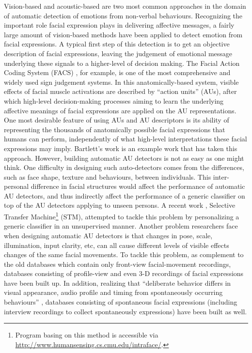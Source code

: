 Vision-based and acoustic-based are two most common approaches in the domain of automatic detection of emotions from non-verbal behaviours. Recognizing the important role facial expression plays in delivering affective messages, a fairly large amount of vision-based methods have been applied to detect emotion from facial expressions. A typical first step of this detection is to get an objective description of facial expressions, leaving the judgement of emotional message underlying these signals to a higher-level of decision making. The Facial Action Coding System (FACS) \cite{ekm02}, for example, is one of the most comprehensive and widely used sign judgement systems. In this anatomically-based system, visible effects of facial muscle activations are described by ``action units'' (AUs), after which high-level decision-making processes aiming to learn the underlying affective meanings of facial expressions are applied on the AU representations. One most desirable feature of using AUs and AU descriptors is its ability of representing the thousands of anatomically possible facial expressions that humans can perform, independently of what high-level interpretations these facial expressions may imply. Bartlett's work \cite{bartlett2005recognizing} is an example work that has taken this approach. However, building automatic AU detectors is not as easy as one might think. One difficulty in designing such auto-detectors comes from the differences, such as face shape, texture and behaviours, between individuals. This inter-personal difference in facial structures would affect the performance of automatic AU detectors, and thus indirectly affect the performance of a generic classifier on top of the AU detectors applying to unseen persons. A recent work \cite{chu2013selective}, Selective Transfer Machine\footnote{Program basing on this method is accessible via \url{http://www.humansensing.cs.cmu.edu/intraface/}.} (STM), attempted to tackle this problem by personalizing a generic classifier in an unsupervised manner. Another problem researchers face when designing automatic AU detectors is that changes in pose, scale, illumination, input clarity, etc, can all cause different levels of visible effects changes of the same facial movements. To tackle this problem, as complement to the old databases which contain only front-view facial-movement recordings, databases consisting of profile-view \cite{pantic2005web} and even 3-D recordings \cite{yin20063d} of facial expressions have been built up. In addition, realizing that ``deliberate behavior differs in visual appearance, audio profile and timing from spontaneously occurring behaviours'' \cite{zeng2009survey}, databases consisting of spontaneous facial expressions (including interview recordings to collect spontaneously expressions) have been built as well.

